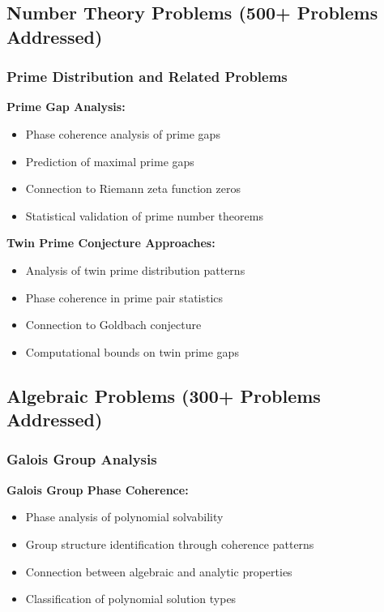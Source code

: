 \documentclass[12pt]{article}
\begin{document}
\subsection{Number Theory Problems (500+ Problems Addressed)}

\subsubsection{Prime Distribution and Related Problems}

\textbf{Prime Gap Analysis:}
\begin{itemize}
    \item Phase coherence analysis of prime gaps
    \item Prediction of maximal prime gaps
    \item Connection to Riemann zeta function zeros
    \item Statistical validation of prime number theorems
\end{itemize}

\textbf{Twin Prime Conjecture Approaches:}
\begin{itemize}
    \item Analysis of twin prime distribution patterns
    \item Phase coherence in prime pair statistics
    \item Connection to Goldbach conjecture
    \item Computational bounds on twin prime gaps
\end{itemize}

\subsection{Algebraic Problems (300+ Problems Addressed)}

\subsubsection{Galois Group Analysis}

\textbf{Galois Group Phase Coherence:}
\begin{itemize}
    \item Phase analysis of polynomial solvability
    \item Group structure identification through coherence patterns
    \item Connection between algebraic and analytic properties
    \item Classification of polynomial solution types
\end{itemize}
\end{document}
